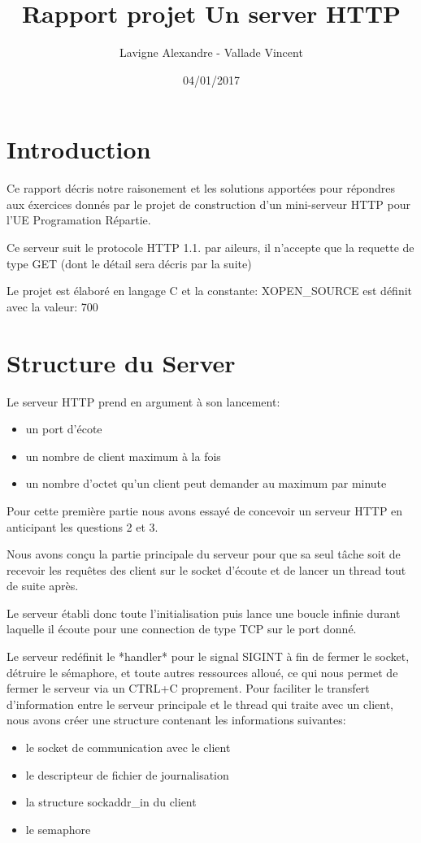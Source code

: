 \documentclass{report}
\title{Rapport projet Un server HTTP}
\author{Lavigne Alexandre - Vallade Vincent}
\date{04/01/2017}
\begin{document}
\maketitle

\section*{Introduction}

Ce rapport décris notre raisonement et les solutions apportées pour répondres aux éxercices donnés
par le projet de construction d'un mini-serveur HTTP pour l'UE Programation Répartie.\hbox{}

Ce serveur suit le protocole HTTP 1.1. par aileurs, il n'accepte que la requette de type GET (dont le détail sera décris par la suite)\hbox{}

Le projet est élaboré en langage C et la constante: XOPEN\_SOURCE est définit avec la valeur: 700



\section{Structure du Server}

Le serveur HTTP prend en argument à son lancement:
\begin{itemize}
\item un port d'écote
\item un nombre de client maximum à la fois
\item un nombre d'octet qu'un client peut demander au maximum par minute
\end{itemize}

Pour cette première partie nous avons essayé de concevoir un serveur HTTP en anticipant les questions 2 et 3.\hbox{}

Nous avons conçu la partie principale du serveur pour que sa seul tâche soit de recevoir les requêtes des client sur le socket d'écoute et de lancer un thread tout de suite après.\hbox{}

Le serveur établi donc toute l'initialisation puis lance une boucle infinie durant laquelle il écoute pour une connection de type TCP sur le port donné.
\hbox{}

Le serveur redéfinit le *handler* pour le signal SIGINT à fin de fermer le socket, détruire le sémaphore, et toute autres ressources alloué, ce qui nous permet de fermer le serveur via un CTRL+C proprement.
Pour faciliter le transfert d'information entre le serveur principale et le thread qui traite avec un client, nous avons créer une structure contenant les informations suivantes:
\begin{itemize}
\item le socket de communication avec le client
\item le descripteur de fichier de journalisation
\item la structure sockaddr\_in du client
\item le semaphore
\end{itemize}
\end{document}

